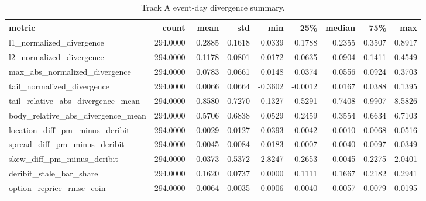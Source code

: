\begin{table}
\caption{Track A event-day divergence summary.}
\label{tab:trackA_divergence_overall}
\begin{tabular}{lrrrrrrrr}
\toprule
metric & count & mean & std & min & 25\% & median & 75\% & max \\
\midrule
l1\_normalized\_divergence & 294.0000 & 0.2885 & 0.1618 & 0.0339 & 0.1788 & 0.2355 & 0.3507 & 0.8917 \\
l2\_normalized\_divergence & 294.0000 & 0.1178 & 0.0801 & 0.0172 & 0.0635 & 0.0904 & 0.1411 & 0.4549 \\
max\_abs\_normalized\_divergence & 294.0000 & 0.0783 & 0.0661 & 0.0148 & 0.0374 & 0.0556 & 0.0924 & 0.3703 \\
tail\_normalized\_divergence & 294.0000 & 0.0066 & 0.0664 & -0.3602 & -0.0012 & 0.0167 & 0.0388 & 0.1395 \\
tail\_relative\_abs\_divergence\_mean & 294.0000 & 0.8580 & 0.7270 & 0.1327 & 0.5291 & 0.7408 & 0.9907 & 8.5826 \\
body\_relative\_abs\_divergence\_mean & 294.0000 & 0.5706 & 0.6838 & 0.0529 & 0.2459 & 0.3554 & 0.6634 & 6.7103 \\
location\_diff\_pm\_minus\_deribit & 294.0000 & 0.0029 & 0.0127 & -0.0393 & -0.0042 & 0.0010 & 0.0068 & 0.0516 \\
spread\_diff\_pm\_minus\_deribit & 294.0000 & 0.0045 & 0.0084 & -0.0183 & -0.0007 & 0.0040 & 0.0097 & 0.0349 \\
skew\_diff\_pm\_minus\_deribit & 294.0000 & -0.0373 & 0.5372 & -2.8247 & -0.2653 & 0.0045 & 0.2275 & 2.0401 \\
deribit\_stale\_bar\_share & 294.0000 & 0.1620 & 0.0737 & 0.0000 & 0.1111 & 0.1667 & 0.2182 & 0.2941 \\
option\_reprice\_rmse\_coin & 294.0000 & 0.0064 & 0.0035 & 0.0006 & 0.0040 & 0.0057 & 0.0079 & 0.0195 \\
\bottomrule
\end{tabular}
\end{table}
